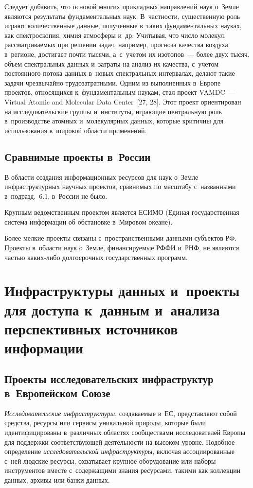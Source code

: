 \begin{multicols}{2}
  Следует добавить, что основой многих прикладных направлений наук о~Земле являются 
результаты фундаментальных наук. В~частности, существенную роль играют 
количественные данные, полученные в~таких фундаментальных науках, как 
спектроскопия, химия атмосферы и~др. Учитывая, что число молекул, рассматриваемых 
при решении задач, например, прогноза качества воздуха в~регионе, достигает почти 
тысячи, а~с~учетом их изотопов~--- более двух тысяч, объем спектральных данных и~затраты 
на анализ их качества, с~учетом постоянного потока данных в~новых спектральных 
интервалах, делают такие задачи чрезвычайно трудозатратными. Одним из выполненных 
в~Европе проектов, относящихся к~фундаментальным наукам, стал проект VAMDC~--- 
Virtual Atomic and Molecular Data Center~[27, 28]. Этот проект ориентирован на 
исследовательские группы и~институты, играющие центральную роль в~производстве 
атомных и~молекулярных данных, которые критичны для использования в~широкой 
области применений. 
  
\subsection{Сравнимые проекты в~России}

  В области создания информационных ресурсов для наук о~Земле инфраструктурных 
научных проектов, сравнимых по масштабу с~названными в~подразд.~6.1, в~России не 
было. 

Крупным ведомственным проектом является ЕСИМО (Единая государственная система
информации об обстановке в~Мировом океане). 

Более мелкие проекты 
связаны с~пространственными данными субъектов РФ. Проекты в~области наук о~Земле, 
финансируемые РФФИ и~РНФ, не являются частью каких-либо долгосрочных 
государственных программ.

\section{Инфраструктуры данных и~проекты для доступа к~данным 
и~анализа перспективных источников информации}

\subsection{Проекты исследовательских инфраструктур в~Европейском Союзе}

  \textit{Исследовательские инфраструктуры}, со\-зда\-ва\-емые в~ЕС, представляют собой 
средства, ресурсы или сервисы уникальной природы, которые были идентифицированы 
в~различных областях сообществами исследователей Европы для поддержки 
соответствующей деятельности на высоком уровне. Подобное определение 
\textit{исследовательской инфраструктуры}, включая ассоциированные с~ней людские 
ресурсы, охватывает крупное оборудование или наборы инструментов вместе 
с~содержащими знания ресурсами, такими как коллекции данных, архивы или банки 
данных.
  

\end{multicols}
